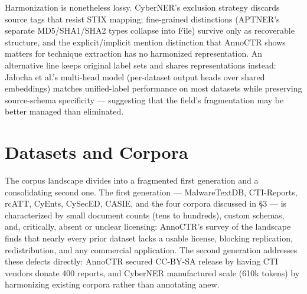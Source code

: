 \documentclass[11pt]{article}
\begin{document}
Harmonization is nonetheless lossy. CyberNER's exclusion strategy discards source tags that resist STIX mapping; fine-grained distinctions (APTNER's separate MD5/SHA1/SHA2 types collapse into File) survive only as recoverable structure, and the explicit/implicit mention distinction that AnnoCTR shows matters for technique extraction has no harmonized representation. An alternative line keeps original label sets and shares representations instead: Ja\l{}ocha et al.'s multi-head model (per-dataset output heads over shared embeddings) matches unified-label performance on most datasets while preserving source-schema specificity — suggesting that the field's fragmentation may be better managed than eliminated.

\section{Datasets and Corpora}

The corpus landscape divides into a fragmented first generation and a consolidating second one. The first generation — MalwareTextDB, CTI-Reports, rcATT, CyEnts, CySecED, CASIE, and the four corpora discussed in §3 — is characterized by small document counts (tens to hundreds), custom schemas, and, critically, absent or unclear licensing: AnnoCTR's survey of the landscape \citep[Table 1]{lange2024annoctr} finds that nearly every prior dataset lacks a usable license, blocking replication, redistribution, and any commercial application. The second generation addresses these defects directly: AnnoCTR secured CC-BY-SA release by having CTI vendors donate 400 reports, and CyberNER manufactured scale (610k tokens) by harmonizing existing corpora rather than annotating anew.
\end{document}
